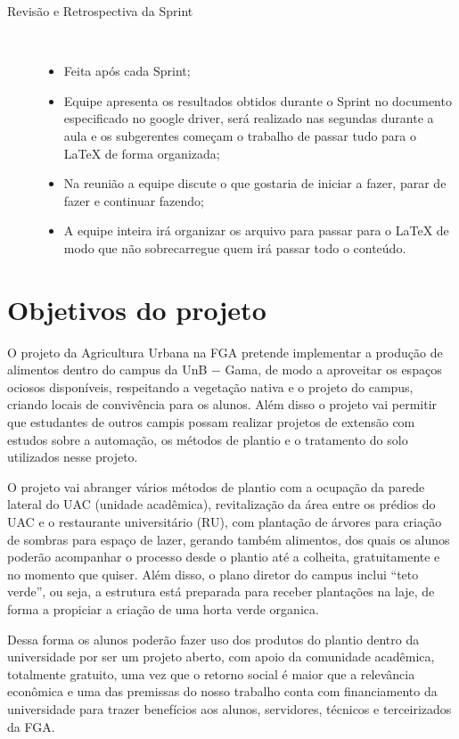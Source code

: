 \begin{description}
    \item[Revisão e Retrospectiva da Sprint] \
      \begin{itemize}
        \item Feita após cada Sprint;
        \item Equipe apresenta os resultados obtidos durante o Sprint no documento especificado no google driver, será realizado nas
          segundas durante a aula e os subgerentes começam o trabalho de passar tudo para o LaTeX de forma organizada;
        \item Na reunião a equipe discute o que gostaria de iniciar a fazer, parar de fazer e continuar fazendo;
        \item A equipe inteira irá organizar os arquivo para passar para o LaTeX de modo que não sobrecarregue quem irá passar
          todo o conteúdo.
      \end{itemize}
  \end{description}

\section{Objetivos do projeto}

  O projeto da Agricultura Urbana na FGA pretende implementar a produção de alimentos dentro do campus da UnB $-$ Gama, de modo a
  aproveitar os espaços ociosos disponíveis, respeitando a vegetação nativa e o projeto do campus, criando locais de convivência para
  os alunos. Além disso o projeto vai permitir que estudantes de outros campis possam realizar projetos de extensão com estudos sobre
  a automação, os métodos de plantio e o tratamento do solo utilizados nesse projeto.

  O projeto vai abranger vários métodos de plantio com a ocupação da parede lateral do UAC (unidade acadêmica), revitalização da
  área entre os prédios do UAC e o restaurante universitário (RU), com plantação de árvores para criação de sombras para espaço de
  lazer, gerando também alimentos, dos quais os alunos poderão acompanhar o processo desde o plantio até a colheita,
  gratuitamente e no momento que quiser. Além disso, o plano diretor do campus inclui “teto verde”, ou seja, a estrutura está
  preparada para receber plantações na laje, de forma a propiciar a criação de uma horta verde organica.

  Dessa forma os alunos poderão fazer uso dos produtos do plantio dentro da universidade por ser um projeto aberto, com apoio da
  comunidade acadêmica, totalmente gratuito, uma vez que o retorno social é maior que a relev\^{a}ncia econ\^{o}mica e uma das premissas
  do nosso trabalho conta com financiamento da universidade para trazer benefícios aos alunos, servidores, técnicos e terceirizados da FGA.

